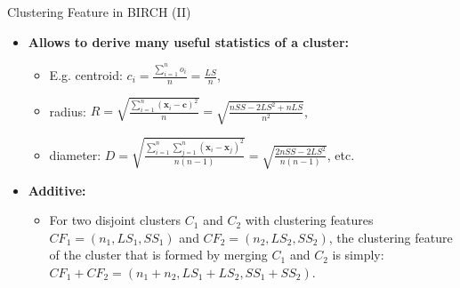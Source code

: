\begin{frame}{Clustering Feature in BIRCH (II)}
	\begin{itemize}
		\item \textbf{Allows to derive many useful statistics of a cluster:}
		      \begin{itemize}
			      \item E.g. centroid: $c_i = \frac{\sum_{i=1}^{n}o_i}{n} =
				            \frac{LS}{n}$,
			      \item radius: $R =
				            \sqrt{\frac{\sum_{i=1}^{n}(\mathbf{x}_i-\mathbf{c})^2}{n}} =
				            \sqrt{\frac{nSS-2LS^2+nLS}{n^2}}$,
			      \item diameter: $D =
				            \sqrt{\frac{\sum_{i=1}^{n}\sum_{j=1}^{n}(\mathbf{x}_i-\mathbf{x}_j)^2}{n(n-1)}}
				            = \sqrt{\frac{2nSS-2LS^2}{n(n-1)}}$, etc.
		      \end{itemize}
		\item \textbf{Additive:}
		      \begin{itemize}
			      \item For two disjoint clusters $C_1$ and $C_2$ with clustering
			            features $CF_1 = (n_1, LS_1, SS_1)$ and $CF_2 = (n_2, LS_2, SS_2)$,
			            the clustering feature of the cluster that is formed by merging
			            $C_1$ and $C_2$ is simply: $CF_1 + CF_2 = (n_1 + n_2, LS_1 + LS_2,
				            SS_1 + SS_2)$.
		      \end{itemize}
	\end{itemize}
\end{frame}


